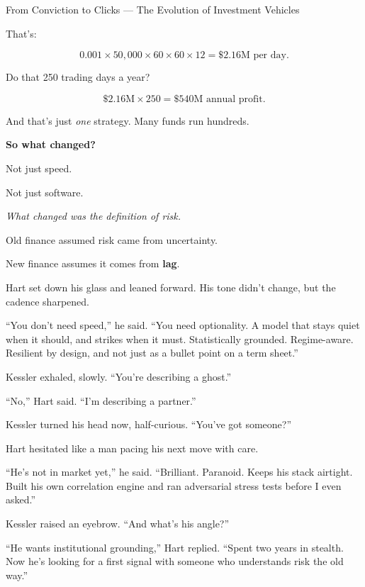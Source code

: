 \begin{HistoricalSidebar}{From Conviction to Clicks --- The Evolution of Investment Vehicles}
  
  That’s:
  
  \[
  0.001 \times 50{,}000 \times 60 \times 60 \times 12 = \$2.16\text{M per day}.
  \]
  
  Do that 250 trading days a year?
  
  \[
  \$2.16\text{M} \times 250 = \$540\text{M annual profit}.
  \]
  
  And that’s just \textit{one} strategy. Many funds run hundreds.

  \medskip
  
  \textbf{So what changed?}

  \medskip
  
  Not just speed.

  \medskip
  
  Not just software.

  \medskip
  
  
  \textit{What changed was the definition of risk.}

  \medskip
  
  Old finance assumed risk came from uncertainty.  

  \medskip

  New finance assumes it comes from \textbf{lag}.
  
\end{HistoricalSidebar}

\medskip

Hart set down his glass and leaned forward. His tone didn’t change, but the cadence sharpened.

“You don’t need speed,” he said. “You need optionality. A model that stays quiet when it should, and strikes 
when it must. Statistically grounded. Regime-aware. Resilient by design, and not just as a bullet point on 
a term sheet.”

Kessler exhaled, slowly. “You’re describing a ghost.”

“No,” Hart said. “I’m describing a partner.”

Kessler turned his head now, half-curious. “You’ve got someone?”

Hart hesitated like a man pacing his next move with care.

“He’s not in market yet,” he said. “Brilliant. Paranoid. Keeps his stack airtight. Built his own correlation 
engine and ran adversarial stress tests before I even asked.”

Kessler raised an eyebrow. “And what’s his angle?”

“He wants institutional grounding,” Hart replied. “Spent two years in stealth. Now he’s looking for a first 
signal with someone who understands risk the old way.”

